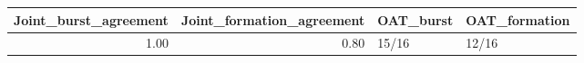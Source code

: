 \begin{tabular}{rrll}
\toprule
Joint_burst_agreement & Joint_formation_agreement & OAT_burst & OAT_formation \\
\midrule
1.00 & 0.80 & 15/16 & 12/16 \\
\bottomrule
\end{tabular}
